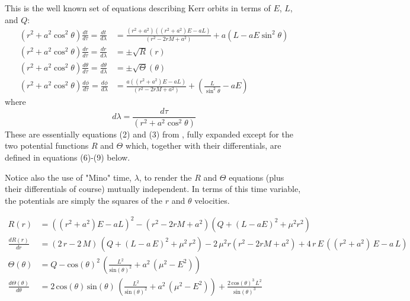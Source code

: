 \documentclass[11pt]{article}
\begin{document}
This is the well known set of equations describing Kerr orbits in terms of $E$, $L$, and $Q$:
\begin{align}
(r^2 + a^2 \cos^2\theta) \frac{d t}{d \tau} = \frac{d t}{d \lambda} &= \frac{(r^2 + a^2) ((r^2 + a^2) E - aL)} {({r}^{2} - 2rM  + {a}^{2})} + a(L - aE \sin^2 \theta) \\
(r^2 + a^2 \cos^2\theta) \frac{d r}{d \tau} = \frac{d r}{d \lambda} &= \pm \sqrt R(r) \\
(r^2 + a^2 \cos^2\theta) \frac{d \theta}{d \tau} = \frac{d \theta}{d \lambda} &= \pm \sqrt \Theta (\theta) \\
(r^2 + a^2 \cos^2\theta) \frac{d \phi}{d \tau} = \frac{d \phi}{d \lambda} &= \frac{a ((r^2 + a^2) E - aL)} {({r}^{2} - 2rM  + {a}^{2})} + (\frac {L} {\sin^2 \theta} -aE)
\end{align}
where
\begin{equation}
d \lambda = \frac {d \tau} {(r^2 + a^2 \cos^2\theta)}
\end{equation}
These are essentially equations (2) and (3) from \cite{wilkins}, fully expanded except for the two potential functions $R$ and $\Theta$ which, together with their differentials, are defined in equations (6)-(9) below.

Notice also the use of "Mino" time, $\lambda$, to render the $R$ and $\Theta$ equations (plus their differentials of course) mutually independent.  In terms of this time variable, the potentials are simply the squares of the $r$ and $\theta$ velocities.

\begin{align}
R(r) &= ((r^2 + a^2) E - aL)^2 - (r^2 - 2rM  + a^{2}) ( Q+{\left( L - aE\right) }^{2}+{\mu}^{2}{r}^{2}) \\
\frac{d R(r)}{d r} &= \left( 2\,r - 2\,M\right) \,\left( Q+{\left( L - a\,E\right) }^{2}+{\mu}^{2}\,{r}^{2}\right) - 2\,{\mu}^{2}r({r}^{2} - 2rM  + {a}^{2}) +4\,r\,E\,\left( \left( {r}^{2}+{a}^{2}\right) \,E - a\,L\right) \\
\Theta (\theta) &= Q - {\mathrm{cos}\left( \theta\right) }^{2}\,\left( \frac{{L}^{2}}{{\mathrm{sin}\left( \theta\right) }^{2}}+{a}^{2}\,\left( {\mu}^{2} - {E}^{2}\right) \right) \\
\frac{d \Theta (\theta)}{d \theta} &= 2\,\mathrm{cos}\left( \theta\right) \,\mathrm{sin}\left( \theta\right) \,\left( \frac{{L}^{2}}{{\mathrm{sin}\left( \theta\right) }^{2}}+{a}^{2}\,\left( {\mu}^{2} - {E}^{2}\right) \right) +\frac{2\,{\mathrm{cos}\left( \theta\right) }^{3}\,{L}^{2}}{{\mathrm{sin}\left( \theta\right) }^{3}}
\end{align}
\end{document}

